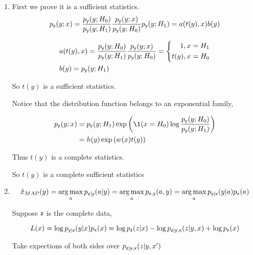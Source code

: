 \documentclass[a4paper]{article}
\begin{document}
\begin{enumerate}
  \item First we prove it is a sufficient statistics.
  \begin{equation}
    p_{\mathsf{y}}(y;x) = \frac{p_{\mathsf{y}}(y;H_0)}{p_{\mathsf{y}}(y;H_1)} \frac{p_{\mathsf{y}}(y;x)}{p_{\mathsf{y}}(y;H_0)} p_{\mathsf{y}}(y;H_1) = a(t(y),x)b(y)
  \end{equation}

  \begin{equation}
    \begin{aligned}
      &a(t(y),x) =  \frac{p_{\mathsf{y}}(y;H_0)}{p_{\mathsf{y}}(y;H_1)} \frac{p_{\mathsf{y}}(y;x)}{p_{\mathsf{y}}(y;H_0)} = \left\{\begin{aligned}
        1,x=H_1 \\ t(y),x=H_0
      \end{aligned}\right. \\ 
      &b(y) = p_{\mathsf{y}}(y;H_1)
    \end{aligned}
  \end{equation}

  So $t(y)$ is a sufficient statistics.

  Notice that the distribution function belongs to an exponential family,

  \begin{equation}
    \begin{aligned}
      p_{\rvy}(y;x) & = p_{\rvy}(y;H_1) \exp\left(\1(x=H_0) \log \frac{p_{\rvy}(y;H_0)}{p_{\rvy}(y;H_1)}\right) \\
      & = h(y) \exp\left( w(x) t(y) \right)
    \end{aligned}
  \end{equation}

  Thus $t(y)$ is a complete statistics.

  So $t(y)$ is a complete sufficient statistics
  
  \item \begin{equation}
    \hat{x}_{MAP}(y) = \operatorname*{arg\,max}_{a} p_{\mathsf{x}|\mathsf{y}} (a|y) = \operatorname*{arg\,max}_{a}  {p_{\mathsf{x},\mathsf{y}} (a,y)} = \operatorname*{arg\,max}_{a}  {p_{\mathsf{y}|\mathsf{x}} (y|a) p_{\mathsf{x}}(a)}
  \end{equation}

  Suppose $\mathsf{z}$ is the complete data,

  \begin{equation}
    L(x) = \log {p_{\mathsf{y}|\mathsf{x}} (y|x) p_{\mathsf{x}}(x)} = \log p_{\mathsf{z}}(z|x) - \log p_{\mathsf{z} | \mathsf{y},\mathsf{x}} (z|y,x) + \log p_{\mathsf{x}}(x)
  \end{equation}

  Take expections of both sides over $p_{\mathsf{z} | \mathsf{y},\mathsf{x}} (z|y,x')$


\end{enumerate}
\end{document}
